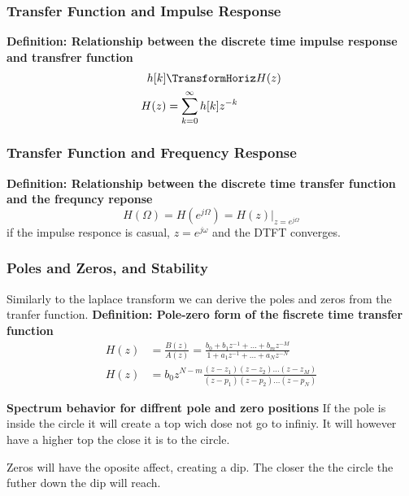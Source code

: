 \subsubsection{Transfer Function and Impulse Response}
\textbf{Definition: Relationship between the discrete time impulse response and transfrer function}
\begin{align*}
    h[k] &\TransformHoriz H(z) \\
    H(z) &= \sum_{k=0}^{\infty} h[k]z^{-k}
\end{align*}

\subsubsection{Transfer Function and Frequency Response}
\textbf{Definition: Relationship between the discrete time transfer function and the frequncy reponse}
\begin{equation*}
    H(\Omega)=H(e^{j\Omega}) = H(z)|_{z=e^{j\Omega}}
\end{equation*}
if the impulse responce is casual, $z=e^{j\omega}$ and the DTFT converges.

\subsubsection{Poles and Zeros, and Stability}
Similarly to the laplace transform we can derive the poles and zeros from the tranfer function.
\textbf{Definition: Pole-zero form of the fiscrete time transfer function}
\begin{align*}
    H(z) &= \frac{B(z)}{A(z)} = \frac{b_0+b_1z^{-1}+\ldots+b_mz^{-M}}{1+a_1z^{-1}+\ldots+a_Nz^{-N}} \\
    H(z) &= b_0z^{N-m}\frac{(z-z_1)(z-z_2)\ldots(z-z_M)}{(z-p_1)(z-p_2)\ldots(z-p_N)}
\end{align*}

\textbf{Spectrum behavior for diffrent pole and zero positions}
If the pole is inside the circle it will create a top wich dose not go to 
infiniy. It will however have a higher top the close it is to the circle.

Zeros will have the oposite affect, creating a dip. The closer the the
circle the futher down the dip will reach.

